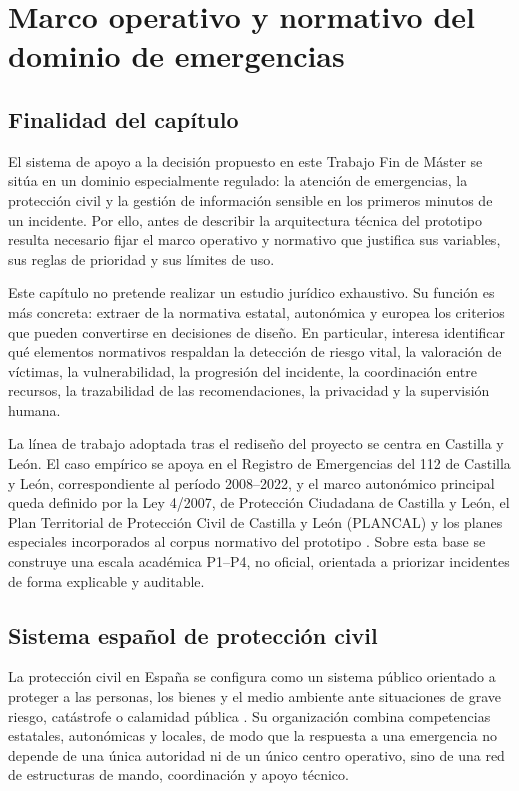 \chapter{Marco operativo y normativo del dominio de emergencias}
\label{cap:3}

\section{Finalidad del capítulo}

El sistema de apoyo a la decisión propuesto en este Trabajo Fin de Máster se sitúa en un dominio especialmente regulado: la atención de emergencias, la protección civil y la gestión de información sensible en los primeros minutos de un incidente. Por ello, antes de describir la arquitectura técnica del prototipo resulta necesario fijar el marco operativo y normativo que justifica sus variables, sus reglas de prioridad y sus límites de uso.

Este capítulo no pretende realizar un estudio jurídico exhaustivo. Su función es más concreta: extraer de la normativa estatal, autonómica y europea los criterios que pueden convertirse en decisiones de diseño. En particular, interesa identificar qué elementos normativos respaldan la detección de riesgo vital, la valoración de víctimas, la vulnerabilidad, la progresión del incidente, la coordinación entre recursos, la trazabilidad de las recomendaciones, la privacidad y la supervisión humana.

La línea de trabajo adoptada tras el rediseño del proyecto se centra en Castilla y León. El caso empírico se apoya en el Registro de Emergencias del 112 de Castilla y León, correspondiente al período 2008--2022, y el marco autonómico principal queda definido por la Ley 4/2007, de Protección Ciudadana de Castilla y León, el Plan Territorial de Protección Civil de Castilla y León (PLANCAL) y los planes especiales incorporados al corpus normativo del prototipo \cite{Ley4_2007_CYL,PLANCAL_DEC_4_2019,Registro112CyL}. Sobre esta base se construye una escala académica P1--P4, no oficial, orientada a priorizar incidentes de forma explicable y auditable.

\section{Sistema español de protección civil}

La protección civil en España se configura como un sistema público orientado a proteger a las personas, los bienes y el medio ambiente ante situaciones de grave riesgo, catástrofe o calamidad pública \cite{Ley17_2015}. Su organización combina competencias estatales, autonómicas y locales, de modo que la respuesta a una emergencia no depende de una única autoridad ni de un único centro operativo, sino de una red de estructuras de mando, coordinación y apoyo técnico.

